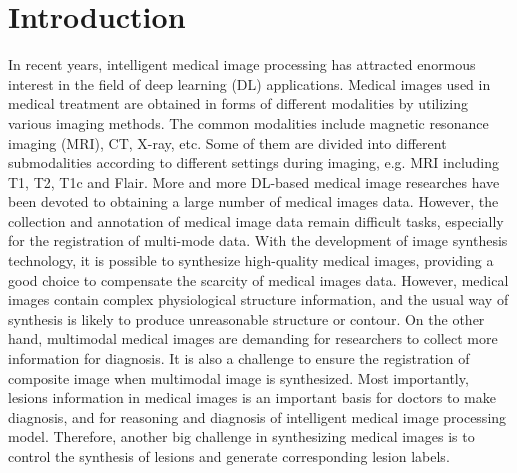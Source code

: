 \documentclass[runningheads]{llncs}
\begin{document}
	\section{Introduction}
	In recent years, intelligent medical image processing has attracted enormous interest in the field of deep learning (DL) applications. Medical images used in medical treatment are obtained in forms of  different modalities by utilizing various imaging methods. The common modalities include magnetic resonance imaging (MRI), CT, X-ray, etc. Some of them are divided into different submodalities according to different settings during imaging, e.g. MRI including T1, T2, T1c and Flair.
	More and more DL-based medical image researches have been devoted to obtaining a large number of medical images data. However, the collection and annotation of medical image data remain difficult tasks, especially for the registration of multi-mode data. With the development of image synthesis technology, it is possible to synthesize high-quality medical images, providing a  good choice to compensate the scarcity of medical images data.
	However, medical images contain complex physiological structure information, and the usual way of synthesis is likely to produce unreasonable structure or contour. On the other hand, multimodal medical images are demanding for researchers to collect more information for diagnosis. It is also a challenge to ensure the registration of composite image when multimodal image is synthesized.
	Most importantly, lesions information in medical images is an important basis for doctors to make diagnosis, and for reasoning and diagnosis of intelligent medical image processing model. Therefore, another big challenge in synthesizing medical images is to control the synthesis of lesions and generate corresponding lesion labels.
	
\end{document}

